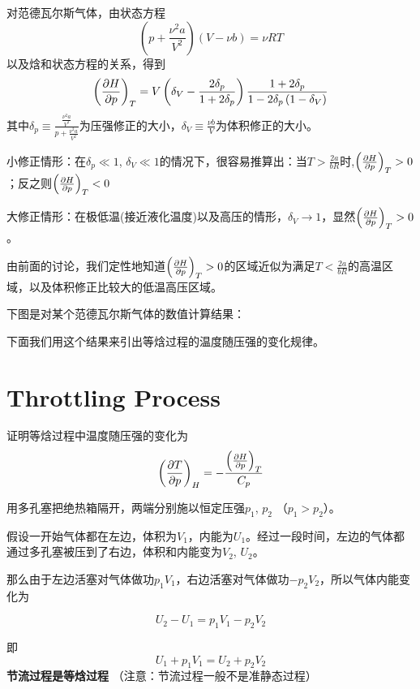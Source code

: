 \documentclass[CJK]{beamer}
\begin{document}
\begin{frame}
\bch
{\small

对范德瓦尔斯气体，由状态方程
$$\left(p + \frac{\nu^2 a}{V^2}\right) \left(V - \nu b\right) = \nu RT$$
以及焓和状态方程的关系，得到
$$\left(\frac{\partial H}{\partial p}\right)_{T} = V \left(\delta_V - \frac{2\delta_p}{1+2\delta_p}\right) \frac{1+2\delta_p}{1-2\delta_p\left(1-\delta_V\right)}$$
其中$\delta_p \equiv \frac{\frac{\nu^2a}{V^2}}{p+\frac{\nu^2 a}{V^2}}$为压强修正的大小，$\delta_V\equiv \frac{\nu b}{V}$为体积修正的大小。

\bitem
\item{小修正情形：在$\delta_p \ll 1$, $\delta_V \ll 1$的情况下，很容易推算出：当$T>\frac{2a}{bR}$时,$\left(\frac{\partial H}{\partial p}\right)_{T}>0$；反之则$\left(\frac{\partial H}{\partial p}\right)_{T}<0$}
\item{大修正情形：在极低温(接近液化温度)以及高压的情形，$\delta_V\rightarrow 1$，显然$\left(\frac{\partial H}{\partial p}\right)_{T}>0$。}
\eitem

}
\ech
\end{frame}



\begin{frame}
\bch
由前面的讨论，我们定性地知道$\left(\frac{\partial H}{\partial p}\right)_{T}>0$的区域近似为满足$T<\frac{2a}{bR}$的高温区域，以及体积修正比较大的低温高压区域。

下图是对某个范德瓦尔斯气体的数值计算结果：

下面我们用这个结果来引出等焓过程的温度随压强的变化规律。
\ech
\end{frame}


\section{Throttling Process}


\begin{frame}
\bch
{}
证明等焓过程中温度随压强的变化为
{\blue
$$\left(\frac{\partial T}{\partial p}\right)_{H} = - \frac{\left(\frac{\partial H}{\partial p}\right)_{T}}{C_p}$$
}
\ech
\end{frame}



\begin{frame}
\bch

\emini
{}
用多孔塞把绝热箱隔开，两端分别施以恒定压强$p_1$, $p_2$ （$p_1>p_2$）。
\emini

{\small

假设一开始气体都在左边，体积为$V_1$，内能为$U_1$。经过一段时间，左边的气体都通过多孔塞被压到了右边，体积和内能变为$V_2$, $U_2$。

那么由于左边活塞对气体做功$p_1V_1$，右边活塞对气体做功$-p_2V_2$，所以气体内能变化为

$$U_2 - U_1  = p_1V_1 - p_2V_2$$

即
$$ U_1 + p_1V_1 = U_2 + p_2V_2 $$
{\blue \bf 节流过程是等焓过程} （注意：节流过程一般不是准静态过程）

}
\ech
\end{frame}
\end{document}
